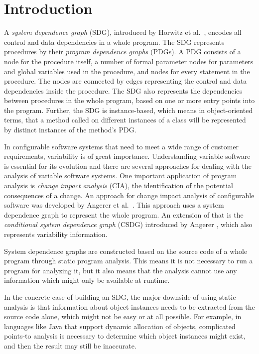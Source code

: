 \chapter{Introduction}

A \emph{system dependence graph} (SDG), introduced by Horwitz et al.\ \cite{DBLP:journals/toplas/HorwitzRB90}, encodes 
all control and data dependencies in a whole program. The SDG represents procedures by their \emph{program dependence 
graphs} (PDGs). A PDG consists of a node for the procedure itself, a number of formal parameter nodes for parameters 
and global variables used in the procedure, and nodes for every statement in the procedure. The nodes are connected by 
edges representing the control and data dependencies inside the procedure. The SDG also represents the dependencies 
between procedures in the whole program, based on one or more entry points into the program. Further, the SDG is 
instance-based, which means in object-oriented terms, that a method called on different instances of a class will be 
represented by distinct instances of the method's PDG.

In configurable software systems that need to meet a wide range of customer requirements, variability is of great 
importance. Understanding variable software is essential for its evolution and there are several approaches for dealing 
with the analysis of variable software systems. One important application of program analysis is \emph{change impact 
analysis} (CIA), the identification of the potential consequences of a change. An approach for change impact analysis 
of configurable software was developed by Angerer et al.\ \cite{DBLP:conf/kbse/AngererGPG15}. This approach uses a 
system dependence graph to represent the whole program. An extension of that is the \emph{conditional system dependence 
graph} (CSDG) introduced by Angerer \cite{DBLP:conf/splc/AngererPLGG14}, which also represents variability information.

System dependence graphs are constructed based on the source code of a whole program through static program analysis. 
This means it is not necessary to run a program for analyzing it, but it also means that the analysis cannot use any 
information which might only be available at runtime.

In the concrete case of building an SDG, the major downside of using static analysis is that information about object 
instances needs to be extracted from the source code alone, which might not be easy or at all possible. For example, in 
languages like Java that support dynamic allocation of objects, complicated points-to analysis is necessary to 
determine which object instances might exist, and then the result may still be inaccurate.

